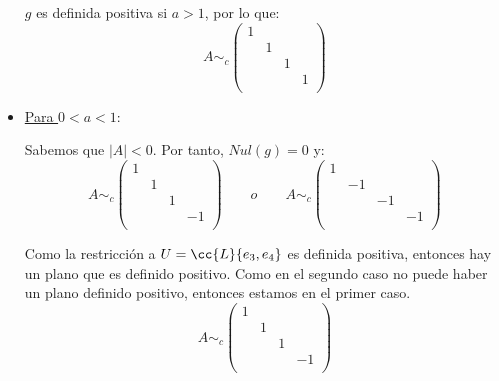 \begin{ejercicio}
\begin{itemize}
        $g$ es definida positiva si $a>1$, por lo que:
        \begin{equation*}
            A\sim_c\left(\begin{array}{cccc}
                 1&&&  \\
                 &1&& \\
                 &&1& \\
                 &&&1 \\
            \end{array}\right)
        \end{equation*}
    
        \item \underline{Para $0<a<1$}:
        
        Sabemos que $|A|<0$. Por tanto, $Nul(g)=0$ y:
        \begin{equation*}
            A\sim_c\left(\begin{array}{cccc}
                 1&&&  \\
                 &1&& \\
                 &&1& \\
                 &&&-1 \\
            \end{array}\right)
            \qquad o \qquad
            A\sim_c\left(\begin{array}{cccc}
                 1&&&  \\
                 &-1&& \\
                 &&-1& \\
                 &&&-1 \\
            \end{array}\right)
        \end{equation*}
    
        Como la restricción a  $U=\cc{L}\{e_3,e_4\}$ es definida positiva, entonces hay un plano que es definido positivo. Como en el segundo caso no puede haber un plano definido positivo, entonces estamos en el primer caso.
        \begin{equation*}
            A\sim_c\left(\begin{array}{cccc}
                 1&&&  \\
                 &1&& \\
                 &&1& \\
                 &&&-1 \\
            \end{array}\right)
        \end{equation*}


\end{itemize}
\end{ejercicio}
